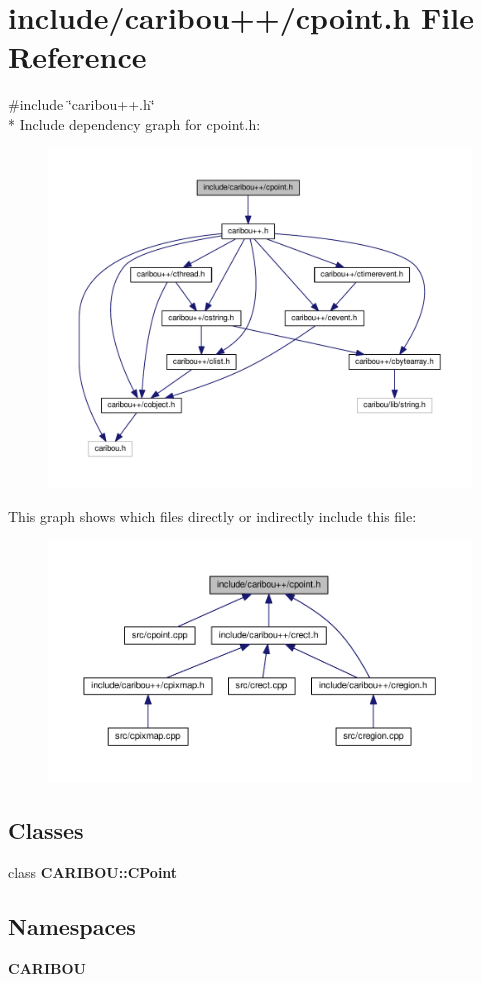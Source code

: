 \section{include/caribou++/cpoint.h File Reference}
\label{cpoint_8h}
{\ttfamily \#include \char`\"{}caribou++.\+h\char`\"{}}\\*
Include dependency graph for cpoint.\+h\+:
\nopagebreak
\begin{figure}[H]
\begin{center}
\leavevmode
\includegraphics[width=350pt]{cpoint_8h__incl}
\end{center}
\end{figure}
This graph shows which files directly or indirectly include this file\+:
\nopagebreak
\begin{figure}[H]
\begin{center}
\leavevmode
\includegraphics[width=350pt]{cpoint_8h__dep__incl}
\end{center}
\end{figure}
\subsection*{Classes}
\begin{DoxyCompactItemize}
\item 
class {\bf C\+A\+R\+I\+B\+O\+U\+::\+C\+Point}
\end{DoxyCompactItemize}
\subsection*{Namespaces}
\begin{DoxyCompactItemize}
\item 
 {\bf C\+A\+R\+I\+B\+OU}
\end{DoxyCompactItemize}
